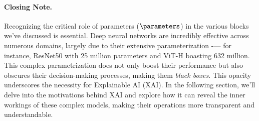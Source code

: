 \paragraph{Closing Note.} Recognizing the critical role of parameters ($\parameters$) in the various blocks we've discussed is essential. Deep neural networks are incredibly effective across numerous domains, largely due to their extensive parameterization -— for instance, ResNet50 with 25 million parameters and ViT-H boasting 632 million. This complex parametrization does not only boost their performance but also obscures their decision-making processes, making them \textit{black boxes}. This opacity underscores the necessity for Explainable AI (XAI). In the following section, we'll delve into the motivations behind XAI and explore how it can reveal the inner workings of these complex models, making their operations more transparent and understandable.
